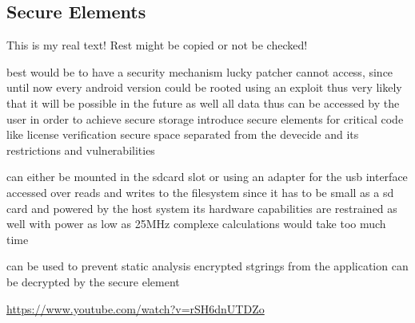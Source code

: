 \subsection{Secure Elements}\label{subsection:counter-external-secure}
This is my real text! Rest might be copied or not be checked!


best would be to have a security mechanism lucky patcher cannot access, since until now every android version could be rooted using an exploit thus very likely that it will be possible in the future as well
all data thus can be accessed by the user
in order to achieve secure storage introduce secure elements for critical code like license verification
secure space separated from the devecide and its restrictions and vulnerabilities\cite{kannengießerProposal}


can either be mounted in the sdcard slot or using an adapter for the usb interface
accessed over reads and writes to the filesystem
since it has to be small as a sd card and powered by the host system its hardware capabilities are restrained as well \cite{stSe} with power as low as 25MHz complexe calculations would take too much time

can be used to prevent static analysis
encrypted stgrings from the application can be decrypted by the secure element

\url{https://www.youtube.com/watch?v=rSH6dnUTDZo}
